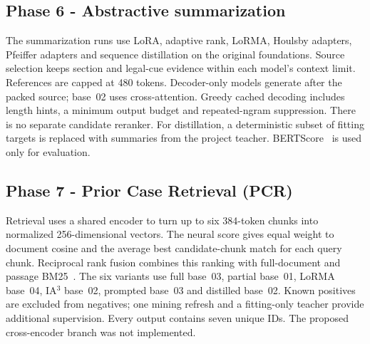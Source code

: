 \subsection{Phase 6 - Abstractive summarization}
The summarization runs use LoRA, adaptive rank, LoRMA, Houlsby adapters, Pfeiffer adapters and sequence distillation on the original foundations. Source selection keeps section and legal-cue evidence within each model's context limit. References are capped at 480 tokens. Decoder-only models generate after the packed source; base~02 uses cross-attention. Greedy cached decoding includes length hints, a minimum output budget and repeated-ngram suppression. There is no separate candidate reranker. For distillation, a deterministic subset of fitting targets is replaced with summaries from the project teacher. BERTScore~\cite{zhang2020bertscore} is used only for evaluation.

\subsection{Phase 7 - Prior Case Retrieval (PCR)}
Retrieval uses a shared encoder to turn up to six 384-token chunks into normalized 256-dimensional vectors. The neural score gives equal weight to document cosine and the average best candidate-chunk match for each query chunk. Reciprocal rank fusion combines this ranking with full-document and passage BM25~\cite{cormack2009rrf}. The six variants use full base~03, partial base~01, LoRMA base~04, IA$^3$ base~02, prompted base~03 and distilled base~02. Known positives are excluded from negatives; one mining refresh and a fitting-only teacher provide additional supervision. Every output contains seven unique IDs. The proposed cross-encoder branch was not implemented.
